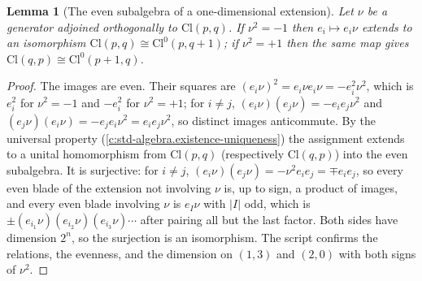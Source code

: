 \documentclass[11pt]{article}
\newtheorem{lemma}[theorem]{Lemma}
\theoremstyle{definition}
\theoremstyle{plain}
\providecommand{\Cl}{}\renewcommand{\Cl}{\mathrm{Cl}}
\begin{document}
\begin{lemma}[The even subalgebra of a one-dimensional extension]\label{c:rule2.even-subalgebra-one-dimensional-extension}
Let $\nu$ be a generator adjoined orthogonally to $\Cl(p,q)$. If $\nu^2 = -1$ then $e_i \mapsto e_i\nu$ extends to an isomorphism $\Cl(p,q) \cong \Cl^0(p,q{+}1)$; if $\nu^2 = +1$ then the same map gives $\Cl(q,p) \cong \Cl^0(p{+}1,q)$.
\end{lemma}
\begin{proof}
The images are even. Their squares are $(e_i\nu)^2 = e_i\nu e_i\nu = -e_i^2\nu^2$, which is $e_i^2$ for $\nu^2 = -1$ and $-e_i^2$ for $\nu^2 = +1$; for $i \neq j$, $(e_i\nu)(e_j\nu) = -e_ie_j\nu^2$ and $(e_j\nu)(e_i\nu) = -e_je_i\nu^2 = e_ie_j\nu^2$, so distinct images anticommute. By the universal property (\ref{c:std-algebra.existence-uniqueness}) the assignment extends to a unital homomorphism from $\Cl(p,q)$ (respectively $\Cl(q,p)$) into the even subalgebra. It is surjective: for $i \neq j$, $(e_i\nu)(e_j\nu) = -\nu^2 e_ie_j = \mp e_ie_j$, so every even blade of the extension not involving $\nu$ is, up to sign, a product of images, and every even blade involving $\nu$ is $e_I\nu$ with $|I|$ odd, which is $\pm(e_{i_1}\nu)(e_{i_2}\nu)(e_{i_3}\nu)\cdots$ after pairing all but the last factor. Both sides have dimension $2^n$, so the surjection is an isomorphism. The script confirms the relations, the evenness, and the dimension on $(1,3)$ and $(2,0)$ with both signs of $\nu^2$.

\end{proof}
\end{document}
